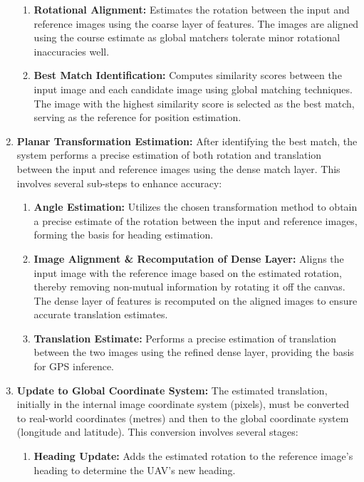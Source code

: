 \begin{enumerate}
\begin{enumerate}
        \item \textbf{Rotational Alignment:}  
        Estimates the rotation between the input and reference images using the coarse layer of features. The images are aligned using the course estimate as global matchers tolerate minor rotational inaccuracies well.
        
        \item \textbf{Best Match Identification:}  
        Computes similarity scores between the input image and each candidate image using global matching techniques. The image with the highest similarity score is selected as the best match, serving as the reference for position estimation.
    \end{enumerate}



    \item \textbf{Planar Transformation Estimation:}  
    After identifying the best match, the system performs a precise estimation of both rotation and translation between the input and reference images using the dense match layer. This involves several sub-steps to enhance accuracy:
    \begin{enumerate}
        \item \textbf{Angle Estimation:}  
        Utilizes the chosen transformation method to obtain a precise estimate of the rotation between the input and reference images, forming the basis for heading estimation.
        
        \item \textbf{Image Alignment \& Recomputation of Dense Layer:}  
        Aligns the input image with the reference image based on the estimated rotation, thereby removing non-mutual information by rotating it off the canvas. The dense layer of features is recomputed on the aligned images to ensure accurate translation estimates.
        
        \item \textbf{Translation Estimate:}  
        Performs a precise estimation of translation between the two images using the refined dense layer, providing the basis for GPS inference.
    \end{enumerate}

    \item \textbf{Update to Global Coordinate System:}  
    The estimated translation, initially in the internal image coordinate system (pixels), must be converted to real-world coordinates (metres) and then to the global coordinate system (longitude and latitude). This conversion involves several stages:
    \begin{enumerate}
        \item \textbf{Heading Update:}  
        Adds the estimated rotation to the reference image's heading to determine the UAV's new heading.
        

\end{enumerate}
\end{enumerate}
